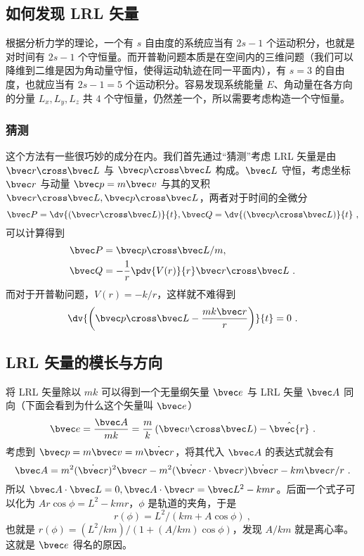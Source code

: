 
\subsection{如何发现 LRL 矢量}
根据分析力学的理论，一个有 $s$ 自由度的系统应当有 $2s-1$ 个运动积分，也就是对时间有 $2s-1$ 个守恒量。而开普勒问题本质是在空间内的三维问题（我们可以降维到二维是因为角动量守恒，使得运动轨迹在同一平面内），有 $s=3$ 的自由度，也就应当有 $2s-1=5$ 个运动积分。容易发现系统能量 $E$、角动量在各方向的分量 $L_x, L_y, L_z$ 共 $4$ 个守恒量，仍然差一个，所以需要考虑构造一个守恒量。

\subsubsection{猜测}
这个方法有一些很巧妙的成分在内。我们首先通过“猜测”考虑 LRL 矢量是由 $\bvec r \cross \bvec L$ 与 $\bvec p \cross \bvec L$ 构成。$\bvec L$ 守恒，考虑坐标 $\bvec r$ 与动量 $\bvec p=m\bvec v$ 与其的叉积
$\bvec r \cross \bvec L, \bvec p \cross \bvec L$，两者对于时间的全微分
$$\bvec P= \dv{\left(\bvec r \cross \bvec L\right)}{t}, \bvec Q =\dv{\left(\bvec p \cross \bvec L\right)}{t} ~,$$
可以计算得到
$$\begin{aligned}
\bvec P &= \bvec p \cross \bvec L/m, \\
\bvec Q &= - \frac{1}{r} \pdv{V(r)}{r} \bvec r \cross \bvec L ~.
\end{aligned}$$
而对于开普勒问题，$V(r) = -k/r$，这样就不难得到
\begin{equation}
\dv{\left(\bvec p \cross \bvec L - \frac{m k \bvec r}{r}\right)}{t}=0 ~.
\end{equation}

\subsection{LRL 矢量的模长与方向}
将 LRL 矢量除以 $mk$ 可以得到一个无量纲矢量 $\bvec e$ 与 LRL 矢量 $\bvec A$ 同向（下面会看到为什么这个矢量叫 $\bvec e$）
$$\bvec e = \frac{\bvec A}{mk} = \frac{m}{k} \left(\bvec v \cross \bvec L \right)- \hat{\bvec{r}} ~.$$
考虑到 $\bvec p = m \bvec v = m \dot{\bvec r}$，将其代入 $\bvec A$ 的表达式就会有
$$\bvec A = m^2 (\dot{\bvec r})^2 \bvec r - m^2(\dot{\bvec r} \cdot \bvec r)\dot{\bvec r} - km \bvec r/r ~.$$
所以 $\bvec A \cdot \bvec L = 0, \bvec A \cdot \bvec r = \bvec L^2 - kmr$。后面一个式子可以化为 $Ar\cos \phi = L^2-kmr$，$\phi$ 是轨道的夹角，于是
$$r(\phi) = L^2/(km + A \cos \phi) ~,$$
也就是 $r(\phi) = (L^2/km)/(1+ (A/km) \cos \phi)$，发现 $A/km$ 就是离心率。这就是 $\bvec e$ 得名的原因。

